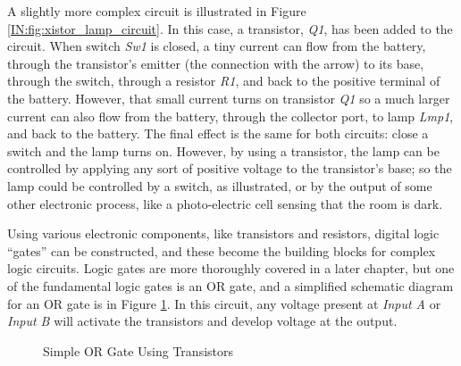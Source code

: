A slightly more complex circuit is illustrated in Figure \ref{IN:fig:xistor_lamp_circuit}. In this case, a transistor, \emph{Q1}, has been added to the circuit. When switch \emph{Sw1} is closed, a tiny current can flow from the battery, through the transistor's emitter (the connection with the arrow) to its base, through the switch, through a resistor \emph{R1}, and back to the positive terminal of the battery. However, that small current turns on transistor \emph{Q1} so a much larger current can also flow from the battery, through the collector port, to lamp \emph{Lmp1}, and back to the battery. The final effect is the same for both circuits: close a switch and the lamp turns on. However, by using a transistor, the lamp can be controlled by applying any sort of positive voltage to the transistor's base; so the lamp could be controlled by a switch, as illustrated, or by the output of some other electronic process, like a photo-electric cell sensing that the room is dark.

Using various electronic components, like transistors and resistors, digital logic ``gates'' can be constructed, and these become the building blocks for complex logic circuits. Logic gates are more thoroughly covered in a later chapter, but one of the fundamental logic gates is an \textsf{OR} gate, and a simplified schematic diagram for an \textsf{OR} gate is in Figure \ref{IN:fig:xistor_or_gate}. In this circuit, any voltage present at \emph{Input A} or \emph{Input B} will activate the transistors and develop voltage at the output. 

\begin{figure}[htb]
  \myfloatalign
  \caption{Simple OR Gate Using Transistors}
  \label{IN:fig:xistor_or_gate}
\end{figure}

